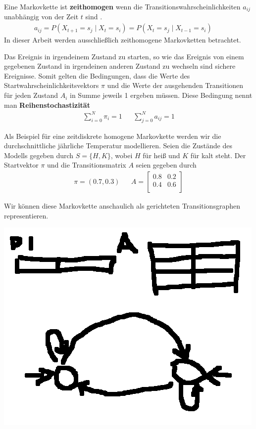 Eine Markovkette ist \textbf{zeithomogen} wenn die Transitionswahrscheinlichkeiten $a_{ij}$ unabhängig von der Zeit $t$ sind \cite{HmmIntroduction}.
\begin{align}
    a_{ij} = P(X_{t+1} = s_j \mid X_t = s_i) = P(X_{t} = s_j \mid X_{t-1} = s_i) && 
\end{align}
In dieser Arbeit werden ausschließlich zeithomogene Markovketten betrachtet.

Das Ereignis in irgendeinem Zustand zu starten, so wie das Ereignis von einem gegebenen Zustand in irgendeinen anderen Zustand zu wechseln sind sichere Ereignisse. Somit gelten die Bedingungen, dass die Werte des Startwahrscheinlichkeitsvektors $\pi$ und die Werte der ausgehenden Transitionen für jeden Zustand $A_i$ in Summe jeweils 1 ergeben müssen. Diese Bedingung nennt man \textbf{Reihenstochastizität}
\begin{align}
    \sum_{i = 0}^{N} \pi_i = 1 && \sum_{j = 0}^{N} a_{ij} = 1
\end{align}

Als Beispiel für eine zeitdiskrete homogene Markovkette werden wir die durchschnittliche jährliche Temperatur modellieren. Seien die Zustände des Modells gegeben durch $S=\{H, K\}$, wobei $H$ für heiß und $K$ für kalt steht. Der Startvektor $\pi$ und die Transitionsmatrix $A$ seien gegeben durch
\begin{align}
    \pi = (0.7, 0.3) && 
    A = 
    \begin{bmatrix}
        0.8 & 0.2 \\
        0.4 & 0.6 \\
    \end{bmatrix}
\end{align}

Wir können diese Markovkette anschaulich als gerichteten Transitionsgraphen representieren.

\includegraphics[scale=1.0]{images/Markov_Chain_Example.png}

